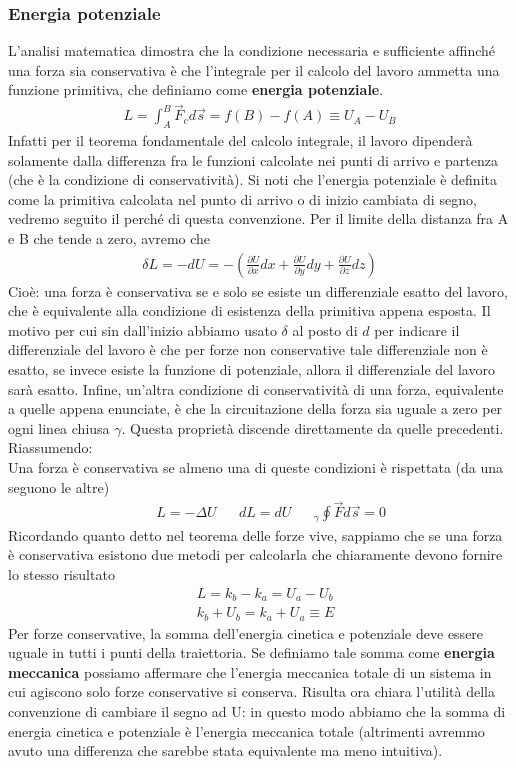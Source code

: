 \subsubsection{Energia potenziale}\label{sec:energiapotenziale}
L'analisi matematica dimostra che la condizione necessaria e sufficiente affinché una forza sia conservativa è che l'integrale per il calcolo del lavoro ammetta una funzione primitiva, che definiamo come \textbf{energia potenziale}. 
\begin{align*}
	L = \int_{A}^{B} \vec{F}_c d\vec{s}= f(B)-f(A)\equiv U_A-U_B
\end{align*}
Infatti per il teorema fondamentale del calcolo integrale, il lavoro dipenderà solamente dalla differenza fra le funzioni calcolate nei punti di arrivo e partenza (che è la condizione di conservatività). Si noti che l'energia potenziale è definita come la primitiva calcolata nel punto di arrivo o di inizio cambiata di segno, vedremo seguito il perché di questa convenzione. Per il limite della distanza fra A e B che tende a zero, avremo che
\begin{align*}
\delta L = -dU = -(\frac{\partial U}{\partial x}dx + \frac{\partial U}{\partial y}dy + \frac{\partial U}{\partial z}dz)
\end{align*}
Cioè: una forza è conservativa se e solo se esiste un differenziale esatto del lavoro, che è equivalente alla condizione di esistenza della primitiva appena esposta. Il motivo per cui sin dall'inizio abbiamo usato $\delta$ al posto di $d$ per indicare il differenziale del lavoro è che per forze non conservative tale differenziale non è esatto, se invece esiste la funzione di potenziale, allora il differenziale del lavoro sarà esatto. Infine, un'altra condizione di conservatività di una forza, equivalente a quelle appena enunciate, è che la circuitazione della forza sia uguale a zero per ogni linea chiusa $\gamma$. Questa proprietà discende direttamente da quelle precedenti. Riassumendo:\\
Una forza è conservativa se almeno una di queste condizioni è rispettata (da una seguono le altre)
\begin{align*}
	&&L = -\Delta U&& dL = dU&&_\gamma\oint\vec{F}d\vec{s} = 0  
\end{align*}
Ricordando quanto detto nel teorema delle forze vive, sappiamo che se una forza è conservativa esistono due metodi per calcolarla che chiaramente devono fornire lo stesso risultato
\begin{align*}
	&L = k_b-k_a = U_a-U_b\\
	&k_b+U_b=k_a+U_a \equiv E
\end{align*}
Per forze conservative, la somma dell'energia cinetica e potenziale deve essere uguale in tutti i punti della traiettoria. Se definiamo tale somma come \textbf{energia meccanica} possiamo affermare che l'energia meccanica totale di un sistema in cui agiscono solo forze conservative si conserva. Risulta ora chiara l'utilità della convenzione di cambiare il segno ad U: in questo modo abbiamo che la somma di energia cinetica e potenziale è l'energia meccanica totale (altrimenti avremmo avuto una differenza che sarebbe stata equivalente ma meno intuitiva).
